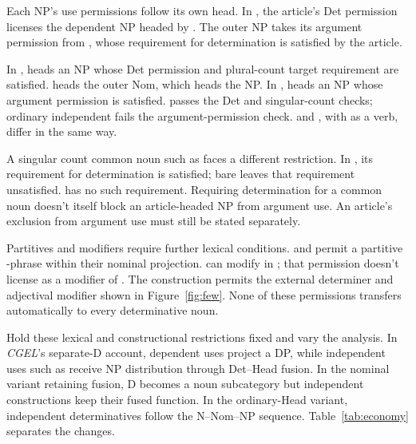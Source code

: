 \documentclass[12pt]{article}
\begin{document}
Each NP's use permissions follow its own head. In , the article's Det permission licenses the dependent NP headed by . The outer NP takes its argument permission from , whose requirement for determination is satisfied by the article.

In ,  heads an NP whose Det permission and plural-count target requirement are satisfied.  heads the outer Nom, which heads the NP. In ,  heads an NP whose argument permission is satisfied.  passes the Det and singular-count checks; ordinary independent  fails the argument-permission check.  and , with  as a verb, differ in the same way.

A singular count common noun such as  faces a different restriction. In , its requirement for determination is satisfied; bare  leaves that requirement unsatisfied.  has no such requirement. Requiring determination for a common noun doesn't itself block an article-headed NP from argument use. An article's exclusion from argument use must still be stated separately.

Partitives and modifiers require further lexical conditions.  and  permit a partitive -phrase within their nominal projection.  can modify  in ; that permission doesn't license  as a modifier of . The construction  permits the external determiner and adjectival modifier shown in Figure~\ref{fig:few}. None of these permissions transfers automatically to every determinative noun.

Hold these lexical and constructional restrictions fixed and vary the analysis. In \textit{CGEL}'s separate-D account, dependent uses project a DP, while independent uses such as  receive NP distribution through Det--Head fusion. In the nominal variant retaining fusion, D becomes a noun subcategory but independent constructions keep their fused function. In the ordinary-Head variant, independent determinatives follow the N--Nom--NP sequence. Table~\ref{tab:economy} separates the changes.
\end{document}
